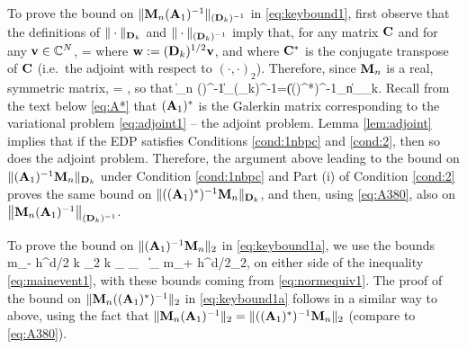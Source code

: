 To prove the bound on $\|\mathbf{M}_n(\mathbf{A}_{1})^{-1}\|_{(\mathbf{D}_k)^{-1}}$ in \eqref{eq:keybound1}, first observe that the definitions of $\|\cdot\|_{\mathbf{D}_k}$ and $\|\cdot\|_{(\mathbf{D}_k)^{-1}}$ imply that, for any matrix $\mathbf{C}$ and for any $\mathbf{v}\in \mathbb C^N$,
\beq\label{eq:A380-0}
 = 
\eeq
where $\mathbf{w} := (\mathbf{D}_k)^{1/2}\mathbf{v}$, and where $\mathbf{C}^*$ is the conjugate transpose of $\mathbf{C}$ (i.e.~the adjoint with respect to $(\cdot,\cdot)_2$).
Therefore, since $\mathbf{M}_n$ is a real, symmetric matrix,
\beqs%
=
,
 \eeqs
 so that 
\beq\label{eq:A380} 
 \big\|\Mmat_n (\Amato)^{-1}\big\|_{(\Dmat_k)^{-1}}=\big\|((\Amato)^*)^{-1}\Mmat_n\big\|_{\Dmat_k}.
 \eeq 
Recall from the text below \eqref{eq:A*} that $(\mathbf{A}_{1})^*$ is the Galerkin matrix corresponding to the variational problem \eqref{eq:adjoint1} -- the adjoint problem. Lemma \ref{lem:adjoint} implies that if the EDP %
satisfies Conditions \ref{cond:1nbpc} and \ref{cond:2}, then so does the adjoint problem. Therefore, the argument above leading to the bound on $\|(\mathbf{A}_{1})^{-1}\mathbf{M}_n\|_{\mathbf{D}_k}$ under Condition \ref{cond:1nbpc} and Part (i) of Condition \ref{cond:2} proves the same bound on $\|((\mathbf{A}_{1})^*)^{-1}\mathbf{M}_n\|_{\mathbf{D}_k}$, and then, using \eqref{eq:A380}, also on $\big\|\mathbf{M}_n(\mathbf{A}_{1})^{-1}\big\|_{(\mathbf{D}_k)^{-1}}$.

To prove the bound on  $\|(\mathbf{A}_{1})^{-1}\mathbf{M}_n\|_{2}$ in \eqref{eq:keybound1a}, we use the bounds 
\beqs
m_- h^{d/2} k \N{\tbu}_2 \leq k _{\LtDR} \leq {}_{\HokDR}
\,\tand\,
\big\|\big\|_{\LtDR} \leq m_+ h^{d/2}\N{\bff}_2,
\eeqs
on either side of the inequality \eqref{eq:mainevent1}, with these bounds coming from \eqref{eq:normequiv1}. The proof of the bound on 
$\|\mathbf{M}_n((\mathbf{A}_{1})^*)^{-1}\|_{2}$ in \eqref{eq:keybound1a} follows in a similar way to above, using the fact that 
$\|\mathbf{M}_n (\mathbf{A}_{1})^{-1}\|_2=\|((\mathbf{A}_{1})^*)^{-1}\mathbf{M}_n\|_2$ (compare to \eqref{eq:A380}).
%
%
\epf

